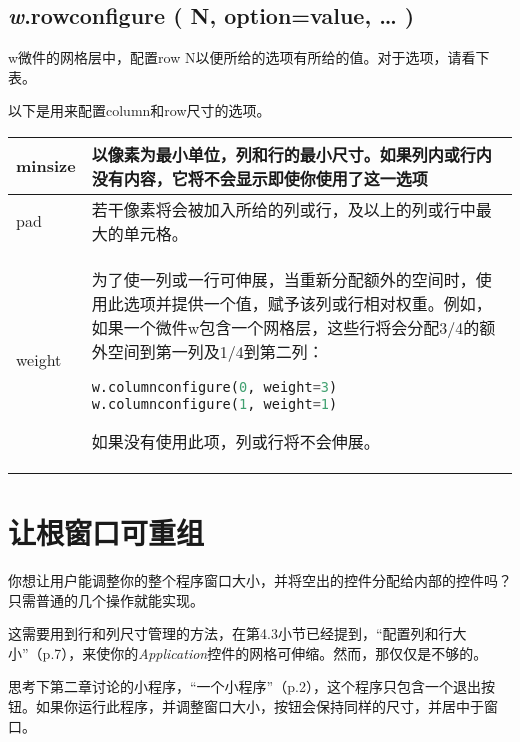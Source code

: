\subsection*{\textsf{\textit{w}.rowconfigure ( N, option=value, … )}}
\par{w微件的网格层中，配置row N以便所给的选项有所给的值。对于选项，请看下表。}

以下是用来配置column和row尺寸的选项。\\
\begin{tabular}{|l|p{}|}
\hline
minsize&
以像素为最小单位，列和行的最小尺寸。如果列内或行内没有内容，它将不会显示即使你使用了这一选项\\ \hline
pad&
若干像素将会被加入所给的列或行，及以上的列或行中最大的单元格。\\ \hline
weight&
为了使一列或一行可伸展，当重新分配额外的空间时，使用此选项并提供一个值，赋予该列或行相对权重。例如，如果一个微件w包含一个网格层，这些行将会分配3/4的额外空间到第一列及1/4到第二列：
\begin{lstlisting}[language=python]
w.columnconfigure(0, weight=3)
w.columnconfigure(1, weight=1)
\end{lstlisting}
如果没有使用此项，列或行将不会伸展。\\ \hline
\end{tabular}

\section{让根窗口可重组}
你想让用户能调整你的整个程序窗口大小，并将空出的控件分配给内部的控件吗？只需普通的几个操作就能实现。

这需要用到行和列尺寸管理的方法，在第4.3小节已经提到，“配置列和行大小”（p.7），来使你的\textit{Application}控件的网格可伸缩。然而，那仅仅是不够的。

思考下第二章讨论的小程序，“一个小程序”（p.2），这个程序只包含一个退出按钮。如果你运行此程序，并调整窗口大小，按钮会保持同样的尺寸，并居中于窗口。


